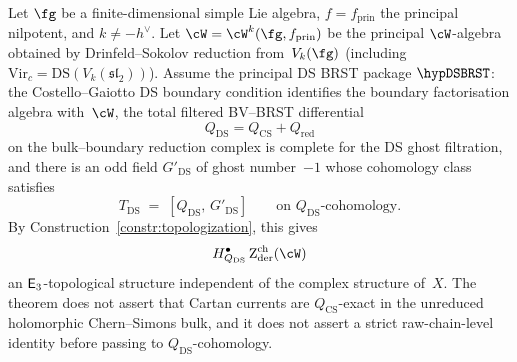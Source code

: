 \begin{theorem}
\label{thm:E3-topological-DS}
\label{conj:E3-topological-DS}%
Let $\fg$ be a finite-dimensional simple Lie algebra,
$f = f_{\mathrm{prin}}$ the principal nilpotent, and
$k \ne -h^\vee$. Let $\cW = \cW^k(\fg, f_{\mathrm{prin}})$ be
the principal $\cW$-algebra obtained by Drinfeld--Sokolov
reduction from~$V_k(\fg)$ \textup{(}including
$\mathrm{Vir}_c = \mathrm{DS}(V_k(\mathfrak{sl}_2))$\textup{)}.
Assume the principal DS BRST package \(\hypDSBRST\): the
Costello--Gaiotto DS boundary condition identifies the boundary
factorisation algebra with~\(\cW\), the total filtered BV--BRST
differential
\[
 Q_{\mathrm{DS}}=Q_{\mathrm{CS}}+Q_{\mathrm{red}}
\]
on the bulk--boundary reduction complex is complete for the DS ghost
filtration, and there is an odd field \(G'_{\mathrm{DS}}\) of ghost
number~\(-1\) whose cohomology class satisfies
\begin{equation}\label{eq:T-DS-BRST}
T_{\mathrm{DS}} \;=\; [Q_{\mathrm{DS}},\, G'_{\mathrm{DS}}]\qquad
\text{on $Q_{\mathrm{DS}}$-cohomology.}
\end{equation}
By Construction~\textup{\ref{constr:topologization}},
this gives
\[
H_{Q_{\mathrm{DS}}}^\bullet\Zder^{\mathrm{ch}}(\cW)
\]
an
$\mathsf{E}_3$-topological structure independent of the complex
structure of~$X$. The theorem does not assert that Cartan currents are
\(Q_{\mathrm{CS}}\)-exact in the unreduced holomorphic
Chern--Simons bulk, and it does not assert a strict raw-chain-level
identity before passing to \(Q_{\mathrm{DS}}\)-cohomology.
\end{theorem}

